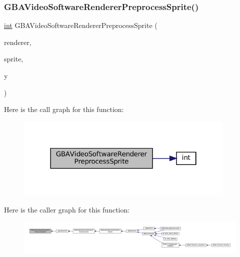 \subsubsection{\texorpdfstring{G\+B\+A\+Video\+Software\+Renderer\+Preprocess\+Sprite()}{GBAVideoSoftwareRendererPreprocessSprite()}}
{\footnotesize\ttfamily \mbox{\hyperlink{ioapi_8h_a787fa3cf048117ba7123753c1e74fcd6}{int}} G\+B\+A\+Video\+Software\+Renderer\+Preprocess\+Sprite (\begin{DoxyParamCaption}\item[{struct G\+B\+A\+Video\+Software\+Renderer $\ast$}]{renderer,  }\item[{struct G\+B\+A\+Obj $\ast$}]{sprite,  }\item[{\mbox{\hyperlink{ioapi_8h_a787fa3cf048117ba7123753c1e74fcd6}{int}}}]{y }\end{DoxyParamCaption})}

Here is the call graph for this function\+:
\nopagebreak
\begin{figure}[H]
\begin{center}
\leavevmode
\includegraphics[width=298pt]{software-private_8h_a1f995eed921e1b4e0963fab4daf5e2da_cgraph}
\end{center}
\end{figure}
Here is the caller graph for this function\+:
\nopagebreak
\begin{figure}[H]
\begin{center}
\leavevmode
\includegraphics[width=350pt]{software-private_8h_a1f995eed921e1b4e0963fab4daf5e2da_icgraph}
\end{center}
\end{figure}
